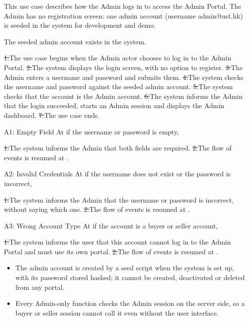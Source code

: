 

\clearpage
{}
This use case describes how the Admin logs in to access the Admin Portal. The Admin has no registration screen: one admin account (username admin@ust.hk) is seeded in the system for development and demo.\par
{}
The seeded admin account exists in the system.\par
{}
\st{1.}{The use case begins when the Admin actor chooses to log in to the Admin Portal.}
\st{2.}{The system displays the login screen, with no option to register.}
\st{3.}{The Admin enters a username and password and submits them.}
\st{4.}{The system checks the username and password against the seeded admin account.}
\st{5.}{The system checks that the account is the Admin account.}
\st{6.}{The system informs the Admin that the login succeeded, starts an Admin session and displays the Admin dashboard.}
\st{7.}{The use case ends.}
\begin{flowblock}{A1: Empty Field}
At  if the username or password is empty,\par
\st{1.}{The system informs the Admin that both fields are required.}
\st{2.}{The flow of events is resumed at .}
\end{flowblock}
\begin{flowblock}{A2: Invalid Credentials}
At  if the username does not exist or the password is incorrect,\par
\st{1.}{The system informs the Admin that the username or password is incorrect, without saying which one.}
\st{2.}{The flow of events is resumed at .}
\end{flowblock}
\begin{flowblock}{A3: Wrong Account Type}
At  if the account is a buyer or seller account,\par
\st{1.}{The system informs the user that this account cannot log in to the Admin Portal and must use its own portal.}
\st{2.}{The flow of events is resumed at .}
\end{flowblock}
\begin{itemize}
  \item The admin account is created by a seed script when the system is set up, with its password stored hashed; it cannot be created, deactivated or deleted from any portal.
  \item Every Admin-only function checks the Admin session on the server side, so a buyer or seller session cannot call it even without the user interface.
\end{itemize}

